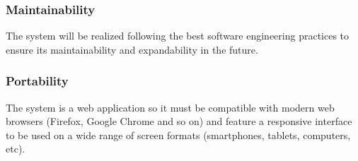 \subsubsection{Maintainability}
The system will be realized following the best software engineering practices to ensure its maintainability and expandability in the future.
\subsubsection{Portability}
The system is a web application so it must be compatible with modern web browsers
(Firefox, Google Chrome and so on) and feature a responsive interface to be used on a wide range of screen formats (smartphones, tablets, computers, etc).